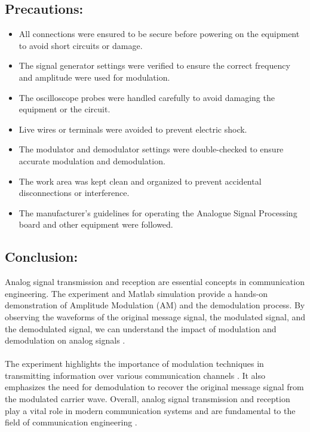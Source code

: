 \documentclass[12pt]{article}
\begin{document}
\subsection*{Precautions:}
\begin{itemize}
    \item All connections were ensured to be secure before powering on the equipment to avoid short circuits or damage.
    \item The signal generator settings were verified to ensure the correct frequency and amplitude were used for modulation.
    \item The oscilloscope probes were handled carefully to avoid damaging the equipment or the circuit.
    \item Live wires or terminals were avoided to prevent electric shock.
    \item The modulator and demodulator settings were double-checked to ensure accurate modulation and demodulation.
    \item The work area was kept clean and organized to prevent accidental disconnections or interference.
    \item The manufacturer's guidelines for operating the Analogue Signal Processing board and other equipment were followed.
\end{itemize}

\subsection*{Conclusion:}
Analog signal transmission and reception are essential concepts in communication engineering. The experiment and Matlab simulation provide a hands-on demonstration of Amplitude Modulation (AM) and the demodulation process. By observing the waveforms of the original message signal, the modulated signal, and the demodulated signal, we can understand the impact of modulation and demodulation on analog signals \cite{haykin2001communication}.
\\\\
The experiment highlights the importance of modulation techniques in transmitting information over various communication channels \cite{proakis2007digital}. It also emphasizes the need for demodulation to recover the original message signal from the modulated carrier wave. Overall, analog signal transmission and reception play a vital role in modern communication systems and are fundamental to the field of communication engineering \cite{sklar2001digital}.



\renewcommand{\bibname}{References}

\end{document}
